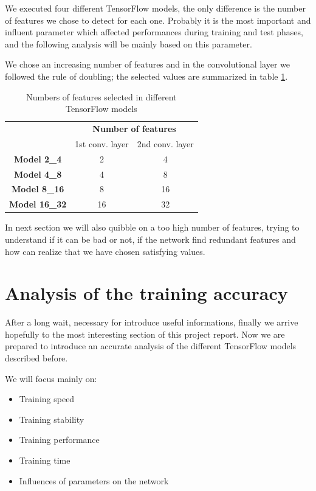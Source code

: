 We executed four different TensorFlow models, the only difference is the number of features we chose to detect for each one. Probably it is the most important and influent parameter which affected performances during training and test phases, and the following analysis will be mainly based on this parameter.

We chose an increasing number of features and in the convolutional layer we followed the rule of doubling; the selected values are summarized in table \ref{tab:features_number}.

\begin{table}
	\centering
	\begin{tabular}{ccc}
		\hline 
		& \multicolumn{2}{c}{\textbf{Number of features}} \\ 
		& 1st conv. layer & 2nd conv. layer \\ 
		\hline 
		\textbf{Model 2\_4} & 2 & 4 \\ 
		\textbf{Model 4\_8} & 4 & 8 \\ 
		\textbf{Model 8\_16} & 8 & 16 \\ 
		\textbf{Model 16\_32} & 16 & 32 \\ 
		\hline 
	\end{tabular}
	\caption{Numbers of features selected in different TensorFlow models}
	\label{tab:features_number}
\end{table}

In next section we will also quibble on a too high number of features, trying to understand if it can be bad or not, if the network find redundant features and how can realize that we have chosen satisfying values.

\section{Analysis of the training accuracy}

After a long wait, necessary for introduce useful informations, finally we arrive hopefully to the most interesting section of this project report. Now we are prepared to introduce an accurate analysis of the different TensorFlow models described before.

We will focus mainly on:
\begin{itemize}
	\item Training speed
	\item Training stability
	\item Training performance
	\item Training time
	\item Influences of parameters on the network
\end{itemize}

